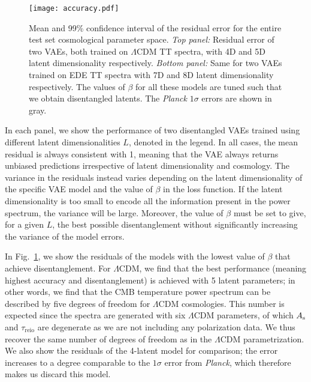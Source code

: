 \documentclass[aps, prd, reprint, superscriptaddress, nofootinbib, bibnotes]{revtex4-2}
\newcommand{\Planck}{\textit{Planck}}
\begin{document}
\begin{figure}
\centering
\texttt{[image: accuracy.pdf]}
\caption{Mean and 99\% confidence interval of the residual error for the entire test set cosmological parameter space. \textit{Top panel:} Residual error of two VAEs, both trained on $\Lambda$CDM TT spectra, with 4D and 5D latent dimensionality respectively. \textit{Bottom panel:} Same for two VAEs trained on EDE TT spectra with 7D and 8D latent dimensionality respectively. The values of $\beta$ for all these models are tuned such that we obtain disentangled latents. The \Planck{} $1\sigma$ errors are shown in gray.}
\label{fig:vae_accuracy}
\end{figure}

In each panel, we show the performance of two disentangled VAEs trained using different latent dimensionalities $L$, denoted in the legend. In all cases, the mean residual is always consistent with 1, meaning that the VAE always returns unbiased predictions irrespective of latent dimensionality and cosmology. The variance in the residuals instead varies depending on the latent dimensionality of the specific VAE model and the value of $\beta$ in the loss function. If the latent dimensionality is too small to encode all the information present in the power spectrum, the variance will be large. Moreover, the value of $\beta$ must be set to give, for a given $L$, the best possible disentanglement without significantly increasing the variance of the model errors. 

In Fig.~\ref{fig:vae_accuracy}, we show the residuals of the models with the lowest value of $\beta$ that achieve disentanglement. For $\Lambda$CDM, we find that the best performance (meaning highest accuracy and disentanglement) is achieved with 5 latent parameters; in other words, we find that the CMB temperature power spectrum can be described by five degrees of freedom for $\Lambda$CDM cosmologies. This number is expected since the spectra are generated with six $\Lambda$CDM parameters, of which $A_{\rm{s}}$ and $\tau_\mathrm{reio}$ are degenerate as we are not including any polarization data. We thus recover the same number of degrees of freedom as in the $\Lambda$CDM parametrization. We also show the residuals of the 4-latent model for comparison; the error increases to a degree comparable to the $1\sigma$ error from \Planck{}, which therefore makes us discard this model. 
\end{document}
